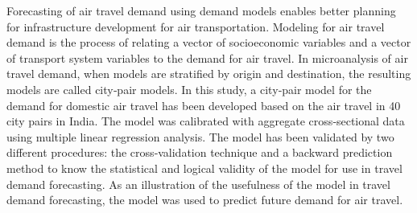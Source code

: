  Forecasting of air travel demand using demand models enables better planning for infrastructure development for air transportation. Modeling for air travel demand is the process of relating a vector of socioeconomic variables and a vector of transport system variables to the demand for air travel. In microanalysis of air travel demand, when models are stratified by origin and destination, the resulting models are called city‐pair models. In this study, a city‐pair model for the demand for domestic air travel has been developed based on the air travel in 40 city pairs in India. The model was calibrated with aggregate cross‐sectional data using multiple linear regression analysis. The model has been validated by two different procedures: the cross‐validation technique and a backward prediction method to know the statistical and logical validity of the model for use in travel demand forecasting. As an illustration of the usefulness of the model in travel demand forecasting, the model was used to predict future demand for air travel. 